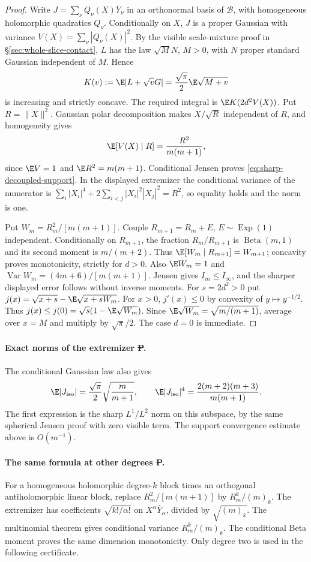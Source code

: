\begin{proof}
Write $J=\sum_\nu Q_\nu(X)\bar Y_\nu$ in an orthonormal basis of
$\mathcal B$, with homogeneous holomorphic quadratics $Q_\nu$.
Conditionally on $X$, $J$ is a proper Gaussian with variance
$V(X)=\sum_\nu|Q_\nu(X)|^2$. By the visible scale-mixture proof in
\S\ref{sec:whole-slice-contact}, $L$ has the law $\sqrt M N$,
$M>0$, with $N$ proper standard Gaussian independent of $M$. Hence
\[
 K(v):=\E|L+\sqrt vG|=\frac{\sqrt\pi}{2}\E\sqrt{M+v}
\]
is increasing and strictly concave. The required integral is
$\E K(2d^2V(X))$. Put $R=\|X\|^2$. Gaussian polar decomposition
makes $X/\sqrt R$ independent of $R$, and homogeneity gives
\[
 \E[V(X)\mid R]=\frac{R^2}{m(m+1)},
\]
since $\E V=1$ and $\E R^2=m(m+1)$. Conditional Jensen proves
\eqref{eq:sharp-decoupled-support}. In the displayed extremizer the
conditional variance of the numerator is
$\sum_i|X_i|^4+2\sum_{i<j}|X_i|^2|X_j|^2=R^2$,
so equality holds and the norm is one.

Put $W_m=R_m^2/[m(m+1)]$. Couple
$R_{m+1}=R_m+E$, $E\sim\operatorname{Exp}(1)$ independent.
Conditionally on $R_{m+1}$, the fraction $R_m/R_{m+1}$ is
$\operatorname{Beta}(m,1)$ and its second moment is $m/(m+2)$.
Thus $\E[W_m\mid R_{m+1}]=W_{m+1}$; concavity proves monotonicity,
strictly for $d>0$. Also $\E W_m=1$ and
$\operatorname{Var}W_m=(4m+6)/[m(m+1)]$. Jensen gives $I_m\le I_\infty$,
and the sharper displayed error follows without inverse moments.
For $s=2d^2>0$ put
$j(x)=\sqrt{x+s}-\E\sqrt{x+sW_m}$. For $x>0$,
$j'(x)\le0$ by convexity of $y\mapsto y^{-1/2}$.
Thus $j(x)\le j(0)=\sqrt s(1-\E\sqrt{W_m})$.
Since $\E\sqrt{W_m}=\sqrt{m/(m+1)}$, average over $x=M$
and multiply by $\sqrt\pi/2$. The case $d=0$ is immediate.
\end{proof}

\paragraph{Exact norms of the extremizer \st{P}.}
The conditional Gaussian law also gives
\[
 \E|J_{\rm iso}|=\frac{\sqrt\pi}{2}\sqrt{\frac m{m+1}},
 \qquad
 \E|J_{\rm iso}|^4=\frac{2(m+2)(m+3)}{m(m+1)}.
\]
The first expression is the sharp $L^1/L^2$ norm on this subspace,
by the same spherical Jensen proof with zero visible term.
The support convergence estimate above is $O(m^{-1})$.

\paragraph{The same formula at other degrees \st{P}.}
For a homogeneous holomorphic degree-$k$ block times an orthogonal
antiholomorphic linear block, replace $R_m^2/[m(m+1)]$ by
$R_m^k/(m)_k$. The extremizer has coefficients
$\sqrt{k!/\alpha!}$ on $X^\alpha\bar Y_\alpha$, divided by
$\sqrt{(m)_k}$. The multinomial theorem gives conditional variance
$R_m^k/(m)_k$. The conditional Beta moment proves the same dimension
monotonicity. Only degree two is used in the following certificate.

